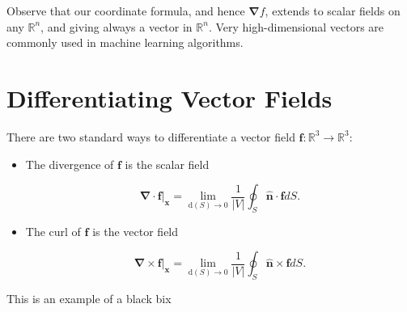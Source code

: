 \begin{remark}
Observe that our coordinate formula, and hence $\boldsymbol{\nabla} f$, extends to scalar fields on any $\mathbb{R}^n$, and giving always a vector in $\mathbb{R}^n$. Very high-dimensional vectors are commonly used in machine learning algorithms.
\end{remark}

\section{Differentiating Vector Fields}

There are two standard ways to differentiate a vector field $\mathbf{f} : \mathbb{R}^3 \rightarrow \mathbb{R}^3$:

\begin{itemize}
  \item The divergence of $\boldsymbol{f}$ is the scalar field

$$
\left.\boldsymbol{\nabla} \cdot \boldsymbol{f}\right|_{\boldsymbol{x}}=\lim _{\mathrm{d}(S) \rightarrow 0} \frac{1}{|V|} \oint_S \hat{\boldsymbol{n}} \cdot \boldsymbol{f} d S .
$$

\item The curl of $\boldsymbol{f}$ is the vector field

$$
\boldsymbol{\nabla} \times\left.\boldsymbol{f}\right|_{\boldsymbol{x}}=\lim _{\mathrm{d}(S) \rightarrow 0} \frac{1}{|V|} \oint_S \hat{\boldsymbol{n}} \times \boldsymbol{f} d S .
$$
\end{itemize}

\begin{blackbox}
  This is an example of a black bix
\end{blackbox} 


